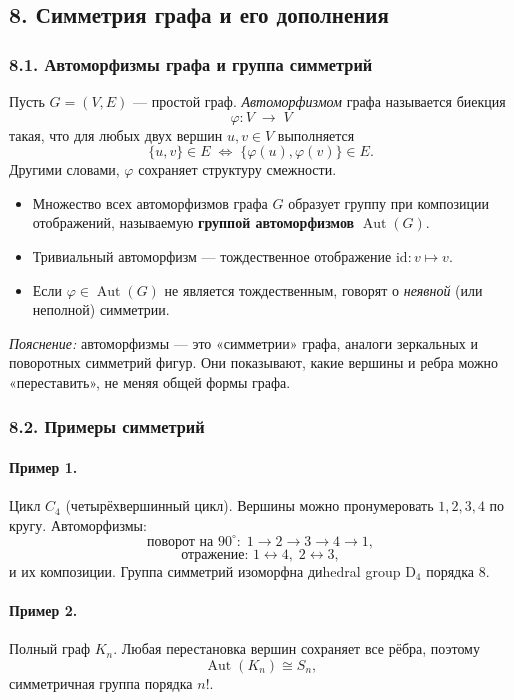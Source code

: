 \subsection{8. Симметрия графа и его дополнения}

\subsubsection{8.1. Автоморфизмы графа и группа симметрий}

Пусть $G=(V,E)$ — простой граф. \emph{Автоморфизмом} графа называется биекция
\[
  \varphi\colon V\;\to\;V
\]
такая, что для любых двух вершин $u,v\in V$ выполняется
\[
  \{u,v\}\in E \;\iff\;\{\varphi(u),\varphi(v)\}\in E.
\]
Другими словами, $\varphi$ сохраняет структуру смежности.

\begin{itemize}[leftmargin=*]
  \item Множество всех автоморфизмов графа $G$ образует группу при композиции отображений, называемую \textbf{группой автоморфизмов} $\operatorname{Aut}(G)$.
  \item Тривиальный автоморфизм — тождественное отображение $\mathrm{id}:v\mapsto v$.
  \item Если $\varphi\in\operatorname{Aut}(G)$ не является тождественным, говорят о \emph{неявной} (или неполной) симметрии.
\end{itemize}

\emph{Пояснение:} автоморфизмы — это «симметрии» графа, аналоги зеркальных и поворотных симметрий фигур. Они показывают, какие вершины и ребра можно «переставить», не меняя общей формы графа.

\subsubsection{8.2. Примеры симметрий}

\paragraph{Пример 1.} Цикл $C_4$ (четырёхвершинный цикл).  
Вершины можно пронумеровать $1,2,3,4$ по кругу. Автоморфизмы:
\[
  \text{поворот на }90^\circ:\;1\to2\to3\to4\to1,
\]
\[
  \text{отражение: }1\leftrightarrow4,\;2\leftrightarrow3,
\]
и их композиции. Группа симметрий изоморфна диhedral group $\mathrm{D}_4$ порядка 8.

\paragraph{Пример 2.} Полный граф $K_n$.  
Любая перестановка вершин сохраняет все рёбра, поэтому
\[
  \operatorname{Aut}(K_n)\cong S_n,
\]
симметричная группа порядка $n!$.

